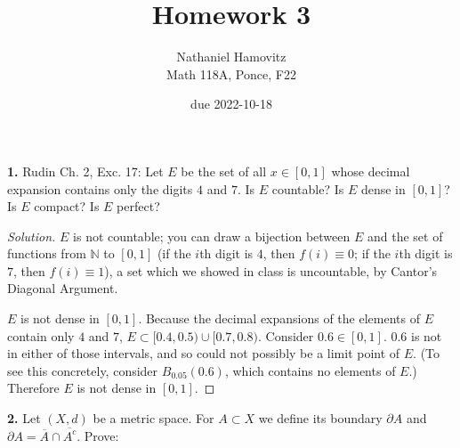 \documentclass{article}
\newcommand{\N}{\mathbb{N}}
\begin{document}


\title{Homework 3} %
\author{Nathaniel Hamovitz\\Math 118A, Ponce, F22}
\date{due 2022-10-18}

\maketitle

\textbf{1. }
Rudin Ch. 2, Exc. 17: Let $E$ be the set of all $x \in [0, 1]$ whose decimal expansion contains only the digits $4$ and $7$. Is $E$ countable? Is $E$ dense in $[0, 1]$? Is $E$ compact? Is $E$ perfect?

\begin{proof}[Solution]
    $E$ is not countable; you can draw a bijection between $E$ and the set of functions from $\N$ to $[0, 1]$ (if the $i$th digit is $4$, then $f(i) \equiv 0$; if the $i$th digit is $7$, then $f(i) \equiv 1$), a set which we showed in class is uncountable, by Cantor's Diagonal Argument.

    $E$ is not dense in $[0, 1]$. Because the decimal expansions of the elements of $E$ contain only $4$ and $7$, $E \subset [0.4, 0.5) \cup [0.7, 0.8)$. Consider $0.6 \in [0, 1]$. $0.6$ is not in either of those intervals, and so could not possibly be a limit point of $E$. (To see this concretely, consider $B_{0.05}(0.6)$, which contains no elements of $E$.) Therefore $E$ is not dense in $[0, 1]$.



    
\end{proof}

\newpage %

\textbf{2. }
Let $(X, d)$ be a metric space. For $A \subset X$ we define its boundary $\partial A$ and $\partial A = \overline{A} \cap \overline{A^c}$. Prove:
\end{document}
